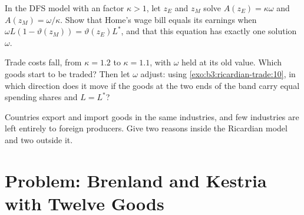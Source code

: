 \begin{exercise}[$\star\star\star$]\label{exo:b3:ricardian-trade:10}
In the DFS model with an  factor $\kappa > 1$, let $z_E$ and $z_M$ solve
$A(z_E) = \kappa\omega$ and $A(z_M) = \omega/\kappa$. Show that Home's wage bill equals its
earnings when $\omega L(1 - \vartheta(z_M)) = \vartheta(z_E) L^*$, and that this equation has
exactly one solution $\omega$.
\end{exercise}

\begin{exercise}[$\star\star\star$]\label{exo:b3:ricardian-trade:11}
Trade costs fall, from $\kappa = 1.2$ to $\kappa = 1.1$, with $\omega$ held at its old
value. Which goods start to be traded? Then let $\omega$ adjust: using
\cref{exo:b3:ricardian-trade:10}, in which direction does it move if the goods at
the two ends of the band carry equal spending shares and $L = L^*$?
\end{exercise}

\begin{exercise}[$\star\star\star$]\label{exo:b3:ricardian-trade:12}
Countries export and import goods in the same industries, and few industries
are left entirely to foreign producers. Give two reasons inside the Ricardian
model and two outside it.
\end{exercise}

\section{Problem: Brenland and Kestria with Twelve Goods}\label{sec:b3:ricardian-trade:problem}

